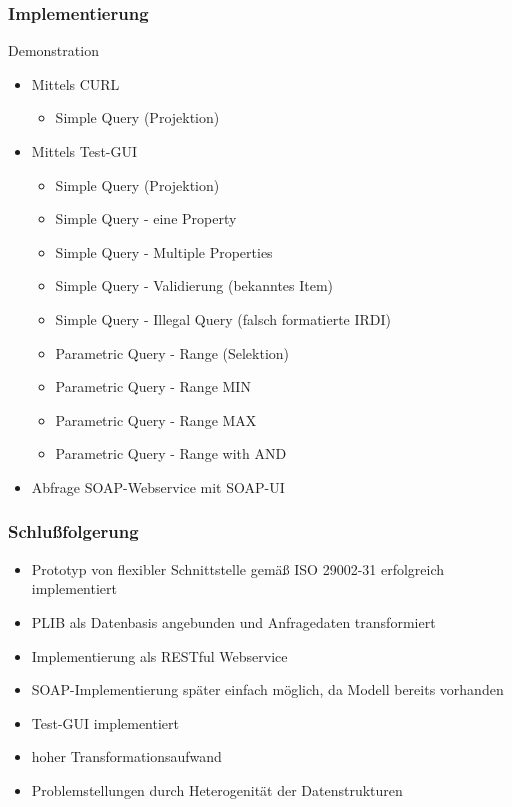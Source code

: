 \documentclass[serif,mathserif]{beamer}
\begin{document}
 \begin{frame}
  \frametitle{Implementierung}
  Demonstration
  
     \begin{itemize}
     \item Mittels CURL
          \begin{itemize}
          \item Simple Query (Projektion)
          \end{itemize}
     \item Mittels Test-GUI
          \begin{itemize}
          \item Simple Query (Projektion)
          \item Simple Query - eine Property
          \item Simple Query - Multiple Properties
          \item Simple Query - Validierung (bekanntes Item)
          \item Simple Query - Illegal Query (falsch formatierte IRDI)
          \item Parametric Query - Range (Selektion)
          \item Parametric Query - Range MIN
          \item Parametric Query - Range MAX
          \item Parametric Query - Range with AND
          \end{itemize}   
        \item Abfrage SOAP-Webservice mit SOAP-UI              
     \end{itemize}
 \end{frame}


\begin{frame}
  \frametitle{Schlußfolgerung}
  
  \begin{itemize}
	\item Prototyp von flexibler Schnittstelle gemäß ISO 29002-31 erfolgreich implementiert
	\item PLIB als Datenbasis angebunden und Anfragedaten transformiert
	\item Implementierung als RESTful Webservice
	\item SOAP-Implementierung später einfach möglich, da Modell bereits vorhanden
	\item Test-GUI implementiert 
	\item hoher Transformationsaufwand
	\item Problemstellungen durch Heterogenität der Datenstrukturen
   \end{itemize}

\end{frame}
\end{document}
